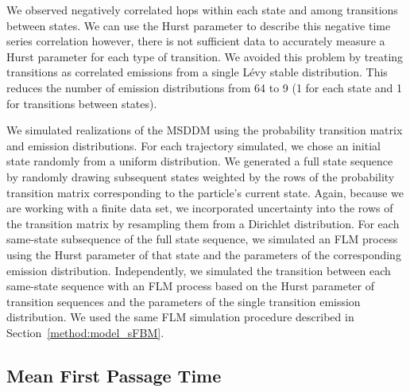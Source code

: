 \documentclass{article}
\begin{document}
  We observed negatively correlated hops within each state and among transitions between
  states. We can use the Hurst parameter to describe this negative time series correlation
  however, there is not sufficient data to accurately measure a Hurst parameter for 
  each type of transition. We avoided this problem by treating transitions as correlated
  emissions from a single L\'evy stable distribution. This reduces the number of emission
  distributions from 64 to 9 (1 for each state and 1 for transitions between states).
  
  We simulated realizations of the MSDDM using the probability transition matrix and 
  emission distributions. For each trajectory simulated, we chose an initial state
  randomly from a uniform distribution. We generated a full state sequence by randomly
  drawing subsequent states weighted by the rows of the probability transition matrix
  corresponding to the particle's current state. Again, because we are working with a
  finite data set, we incorporated uncertainty into the rows of the transition matrix 
  by resampling them from a Dirichlet distribution. For each same-state subsequence of
  the full state sequence, we simulated an FLM process using the Hurst parameter of that
  state and the parameters of the corresponding emission distribution. Independently, 
  we simulated the transition between each same-state sequence with an FLM process 
  based on the Hurst parameter of transition sequences and the parameters of the 
  single transition emission distribution. We used the same FLM simulation procedure
  described in Section~\ref{method:model_sFBM}.


  \subsection{Mean First Passage Time}\label{method:mfpt}
  
\end{document}
